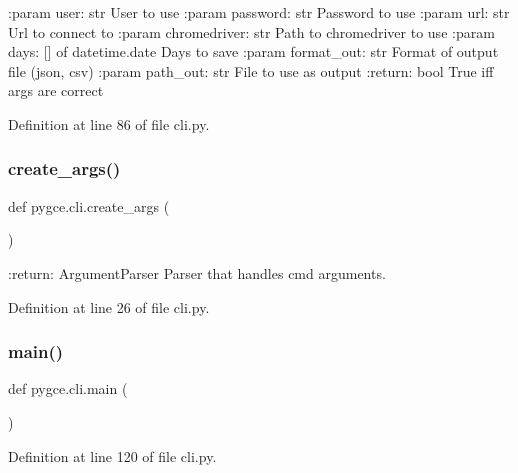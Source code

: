 \begin{DoxyVerb}:param user: str
    User to use
:param password: str
    Password to use
:param url: str
    Url to connect to
:param chromedriver: str
    Path to chromedriver to use
:param days: [] of datetime.date
    Days to save
:param format_out: str
    Format of output file (json, csv)
:param path_out: str
    File to use as output
:return: bool
    True iff args are correct
\end{DoxyVerb}
 

Definition at line 86 of file cli.\+py.

\mbox{\label{namespacepygce_1_1cli_a5734100556cffce34b4b53f9d027080b}} 
\subsubsection{\texorpdfstring{create\+\_\+args()}{create\_args()}}
{\footnotesize\ttfamily def pygce.\+cli.\+create\+\_\+args (\begin{DoxyParamCaption}{ }\end{DoxyParamCaption})}

\begin{DoxyVerb}:return: ArgumentParser
    Parser that handles cmd arguments.
\end{DoxyVerb}
 

Definition at line 26 of file cli.\+py.

\mbox{\label{namespacepygce_1_1cli_a696dc9e135d9815a0d4a889eb94c18fb}} 
\subsubsection{\texorpdfstring{main()}{main()}}
{\footnotesize\ttfamily def pygce.\+cli.\+main (\begin{DoxyParamCaption}{ }\end{DoxyParamCaption})}



Definition at line 120 of file cli.\+py.

\mbox{\label{namespacepygce_1_1cli_a7729e758c25a70a57c0578bd4dde32df}} 
